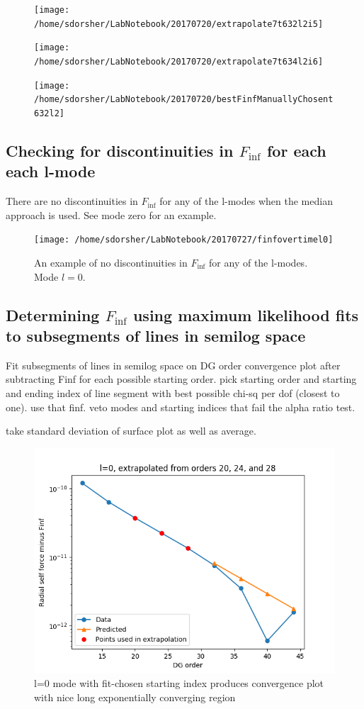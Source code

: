 \begin{figure}
  \texttt{[image: /home/sdorsher/LabNotebook/20170720/extrapolate7t632l2i5]}
\end{figure}

\begin{figure}
  \texttt{[image: /home/sdorsher/LabNotebook/20170720/extrapolate7t634l2i6]}
\end{figure}

\begin{figure}
  \texttt{[image: /home/sdorsher/LabNotebook/20170720/bestFinfManuallyChosent632l2]}
\end{figure}

\subsection{ Checking for discontinuities in $F_{\inf}$ for each each l-mode}

There are no discontinuities in $F_{\inf}$ for any of the l-modes when the median approach is used. See mode zero for an example.

\begin{figure}
  \texttt{[image: /home/sdorsher/LabNotebook/20170727/finfovertimel0]}
  \caption{An example of no discontinuities in $F_{\inf}$ for any of the l-modes. Mode $l=0$.}
\end{figure}


\subsection{Determining $F_{\inf}$ using maximum likelihood fits to subsegments of lines in semilog space}
Fit subsegments of lines in semilog space on DG order convergence plot after subtracting Finf for each possible starting order. pick starting order and starting and ending index of line segment with best possible chi-sq per dof (closest to one). use that finf. veto modes and starting indices that fail the alpha ratio test.

take standard deviation of surface plot as well as average.
\begin{figure}
  \includegraphics{fittingtechniqet370l0}
  \caption{l=0 mode with fit-chosen starting index produces convergence plot with nice long exponentially converging region}
\end{figure}





